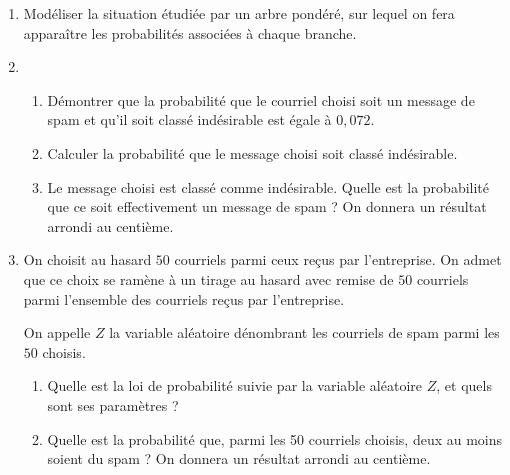 \begin{enumerate}
	\item Modéliser la situation étudiée par un arbre pondéré, sur lequel on fera apparaître les probabilités associées à chaque branche.
	\item 
	\begin{enumerate}
		\item Démontrer que la probabilité que le courriel choisi soit un message de spam et qu'il soit classé indésirable est égale à $0,072$.
		\item Calculer la probabilité que le message choisi soit classé indésirable.
		\item Le message choisi est classé comme indésirable. Quelle est la probabilité que ce soit effectivement un message de spam ? On donnera un résultat arrondi au centième.
	\end{enumerate}
	\item On choisit au hasard $50$ courriels parmi ceux reçus par l'entreprise. On admet que ce choix se ramène à un tirage au hasard avec remise de $50$ courriels parmi l'ensemble des courriels reçus par l'entreprise.
	
	On appelle $Z$ la variable aléatoire dénombrant les courriels de spam parmi les $50$ choisis.
	\begin{enumerate}
		\item Quelle est la loi de probabilité suivie par la variable aléatoire $Z$, et quels sont ses paramètres ?
		\item Quelle est la probabilité que, parmi les 50 courriels choisis, deux au moins soient du spam ? On donnera un résultat arrondi au centième.
	\end{enumerate}
\end{enumerate}

